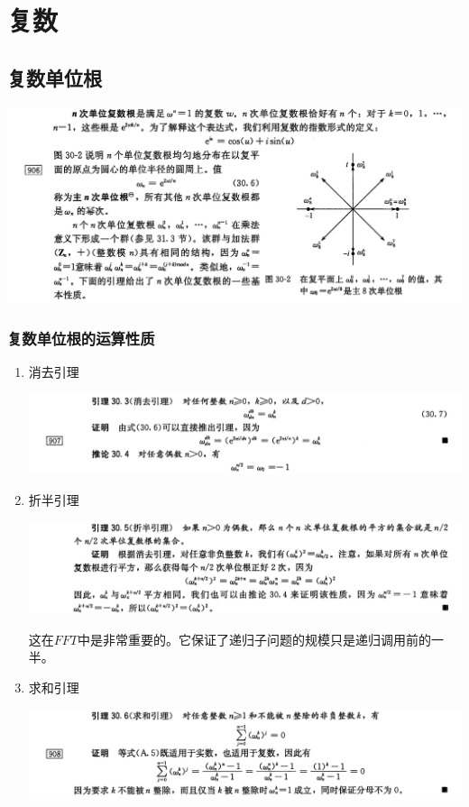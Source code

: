 \documentclass[11pt]{article}
\begin{document}
\section{复数}
\label{sec-2}
\subsection{复数单位根}
\label{sec-2-1}

\includegraphics[width=.9\linewidth]{./Source/Complex/1.png}

\subsubsection{复数单位根的运算性质}
\label{sec-2-1-1}
\begin{enumerate}
\item 消去引理
\label{sec-2-1-1-1}

\includegraphics[width=.9\linewidth]{./Source/Complex/4.png}

\item 折半引理
\label{sec-2-1-1-2}

\includegraphics[width=.9\linewidth]{./Source/Complex/2.png}

这在\(FFT\)中是非常重要的。它保证了递归子问题的规模只是递归调用前的一半。
\item 求和引理
\label{sec-2-1-1-3}

\includegraphics[width=.9\linewidth]{./Source/Complex/3.png}
\end{enumerate}
\end{document}
